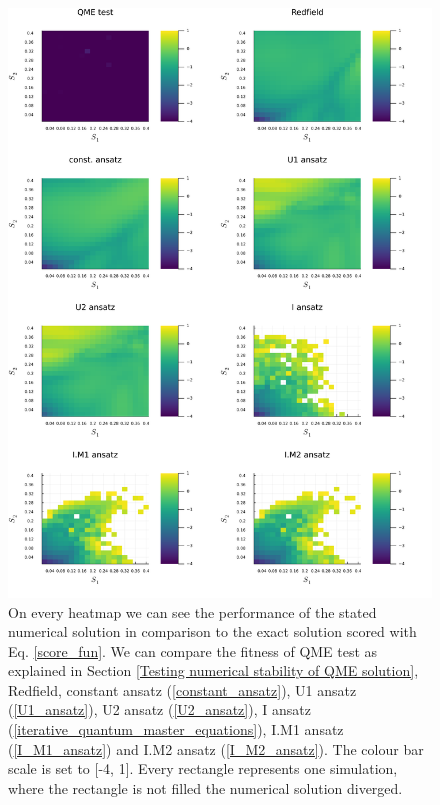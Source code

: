 \newpage
\begin{figure}[H]
\centering
\includegraphics[width=1.0\textwidth]{img/scans/hr_scan_1_score_1.png}
\caption{On every heatmap we can see the performance of the stated numerical solution in comparison to the exact solution scored with Eq. \ref{score_fun}. We can compare the fitness of QME test as explained in Section \ref{Testing numerical stability of QME solution}, Redfield, constant ansatz (\ref{constant_ansatz}), U1 ansatz (\ref{U1_ansatz}), U2 ansatz (\ref{U2_ansatz}), I ansatz (\ref{iterative_quantum_master_equations}), I.M1 ansatz (\ref{I_M1_ansatz}) and I.M2 ansatz (\ref{I_M2_ansatz}). The colour bar scale is set to [-4, 1]. Every rectangle represents one simulation, where the rectangle is not filled the numerical solution diverged. }
\label{img:hr_scan_1_score_1}
\end{figure}

